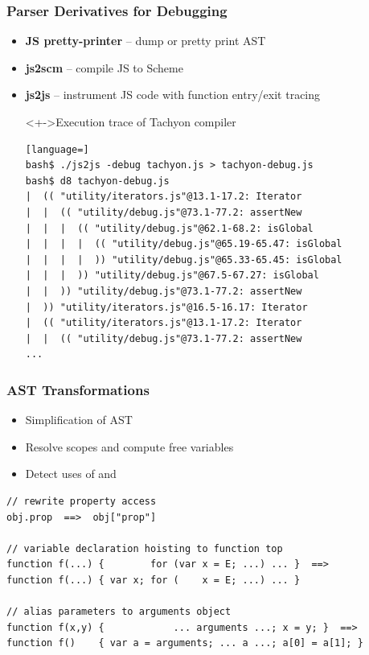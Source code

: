 \begin{frame}[fragile]
\frametitle{\bf Parser Derivatives for Debugging}

  \begin{itemize}

  \item {\bf JS pretty-printer} -- dump or pretty print AST
    \smallskip

  \item {\bf js2scm} -- compile JS to Scheme
    \smallskip

  \item {\bf js2js} -- instrument JS code with function entry/exit tracing
    \smallskip

\begin{block}<+->{Execution trace of Tachyon compiler}
\begin{lstlisting}[language=]
bash$ ./js2js -debug tachyon.js > tachyon-debug.js
bash$ d8 tachyon-debug.js
|  (( "utility/iterators.js"@13.1-17.2: Iterator
|  |  (( "utility/debug.js"@73.1-77.2: assertNew
|  |  |  (( "utility/debug.js"@62.1-68.2: isGlobal
|  |  |  |  (( "utility/debug.js"@65.19-65.47: isGlobal
|  |  |  |  )) "utility/debug.js"@65.33-65.45: isGlobal
|  |  |  )) "utility/debug.js"@67.5-67.27: isGlobal
|  |  )) "utility/debug.js"@73.1-77.2: assertNew
|  )) "utility/iterators.js"@16.5-16.17: Iterator
|  (( "utility/iterators.js"@13.1-17.2: Iterator
|  |  (( "utility/debug.js"@73.1-77.2: assertNew
...
\end{lstlisting}
\end{block}

  \end{itemize}

\end{frame}

\begin{frame}[fragile]
\frametitle{\bf AST Transformations}

  \begin{itemize}
  \item Simplification of AST
  \item Resolve scopes and compute free variables
  \item Detect uses of  and 
  \end{itemize}
  \bigskip

\begin{lstlisting}[keepspaces=true]
// rewrite property access
obj.prop  ==>  obj["prop"]

// variable declaration hoisting to function top
function f(...) {        for (var x = E; ...) ... }  ==>
function f(...) { var x; for (    x = E; ...) ... }

// alias parameters to arguments object
function f(x,y) {            ... arguments ...; x = y; }  ==>
function f()    { var a = arguments; ... a ...; a[0] = a[1]; }
\end{lstlisting}

\end{frame}
